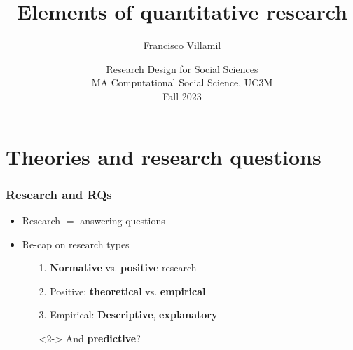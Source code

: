 \documentclass[aspectratio=43]{beamer}
\title[Lecture 2: Elements of quantitative research]{\Large Elements of quantitative research}
\author[]{Francisco Villamil}
\date[]{Research Design for Social Sciences\\MA Computational Social Science, UC3M\\Fall 2023}
\begin{document}

\begin{frame}
  \titlepage
\end{frame}

\section{Theories and research questions}

\begin{frame}
\frametitle{Research and RQs}
\centering

\begin{itemize}
  \item Research $=$ answering questions
  \item Re-cap on research types
  \begin{itemize}
    \item[1.] \textbf{Normative} vs. \textbf{positive} research
    \item[2.] Positive: \textbf{theoretical} vs. \textbf{empirical}
    \item[3.] Empirical: \textbf{Descriptive}, \textbf{explanatory}
    \item[]<2-> And \textbf{predictive}?
  \end{itemize}
\end{itemize}

\end{frame}
\end{document}
